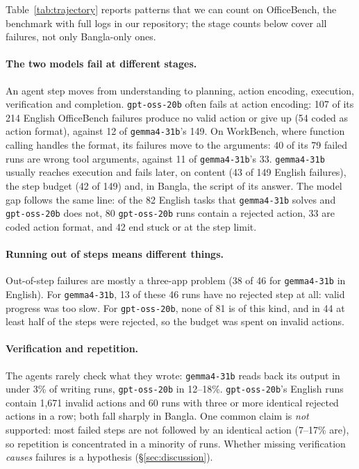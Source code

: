 \documentclass[11pt]{article}
\newcommand{\gemma}{\texttt{gemma4-31b}}
\newcommand{\gptoss}{\texttt{gpt-oss-20b}}
\newcommand{\OB}{OfficeBench}
\newcommand{\WB}{WorkBench}
\begin{document}
Table~\ref{tab:trajectory} reports patterns that we can count on \OB{}, the benchmark with full
logs in our repository; the stage counts below cover all failures, not only Bangla-only ones.

\paragraph{The two models fail at different stages.} An agent step moves from understanding to
planning, action encoding, execution, verification and completion. \gptoss{} often fails at
action encoding: 107 of its 214 English \OB{} failures produce no valid action or give up (54
coded as action format), against 12 of \gemma{}'s 149. On \WB{}, where function calling handles
the format, its failures move to the arguments: 40 of its 79 failed runs are wrong tool arguments,
against 11 of \gemma{}'s 33. \gemma{} usually reaches execution and fails later, on content (43 of
149 English failures), the step budget (42 of 149) and, in Bangla, the script of its answer.
The model gap follows the same line: of the 82 English tasks that \gemma{} solves and \gptoss{}
does not, 80 \gptoss{} runs contain a rejected action, 33 are coded action format, and 42 end
stuck or at the step limit.

\paragraph{Running out of steps means different things.} Out-of-step failures are mostly a
three-app problem (38 of 46 for \gemma{} in English). For \gemma{}, 13 of these 46 runs have no
rejected step at all: valid progress was too slow. For \gptoss{}, none of 81 is of this kind, and in
44 at least half of the steps were rejected, so the budget was spent on invalid actions.

\paragraph{Verification and repetition.} The agents rarely check what they wrote: \gemma{} reads
back its output in under 3\% of writing runs, \gptoss{} in 12--18\%. \gptoss{}'s English runs
contain 1{,}671 invalid actions and 60 runs with three or more identical rejected actions in a row;
both fall sharply in Bangla. One common claim is \emph{not} supported: most failed steps are not
followed by an identical action (7--17\% are), so repetition is concentrated in a minority of runs.
Whether missing verification \emph{causes} failures is a hypothesis (\S\ref{sec:discussion}).
\end{document}
